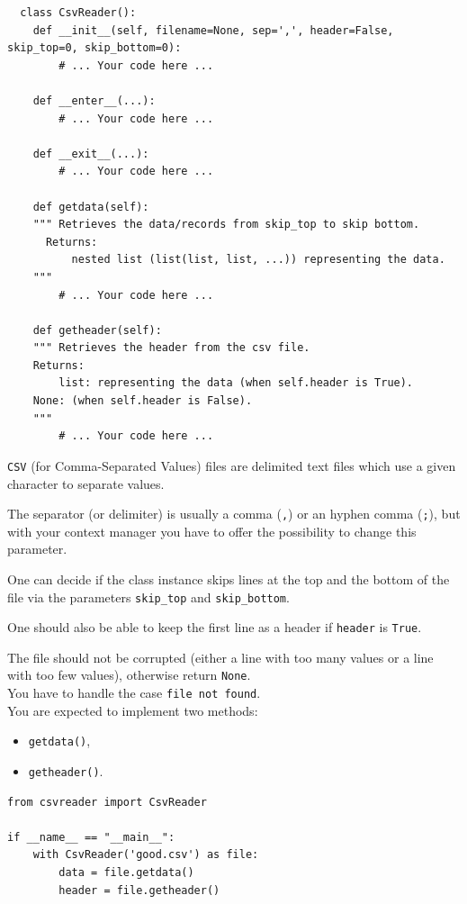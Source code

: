 \documentclass{42-en}
\begin{document}
\begin{verbatim}
  class CsvReader():
	def __init__(self, filename=None, sep=',', header=False, skip_top=0, skip_bottom=0):
		# ... Your code here ...

	def __enter__(...):
		# ... Your code here ...
	
	def __exit__(...):
		# ... Your code here ...
	
	def getdata(self):
	""" Retrieves the data/records from skip_top to skip bottom.
	  Returns:
		  nested list (list(list, list, ...)) representing the data.
	"""
		# ... Your code here ...

	def getheader(self):
	""" Retrieves the header from the csv file.
	Returns:
		list: representing the data (when self.header is True).
    None: (when self.header is False).
	"""
		# ... Your code here ...
\end{verbatim}

\texttt{CSV} (for Comma-Separated Values) files are delimited text files which use a given character to separate values.

The separator (or delimiter) is usually a comma (\texttt{,}) or an hyphen comma (\texttt{;}), 
but with your context manager you have to offer the possibility to change this parameter.

One can decide if the class instance skips lines at the top and the bottom of the file via the
parameters \texttt{skip\_top} and \texttt{skip\_bottom}.

One should also be able to keep the first line as a header if \texttt{header} is \texttt{True}.

The file should not be corrupted (either a line with too many values or a line
with too few values), otherwise return \texttt{None}.\\

You have to handle the case \texttt{file not found}.\\

You are expected to implement two methods:
\begin{itemize}
  \item \texttt{getdata()},
  \item \texttt{getheader()}.
\end{itemize}

\begin{verbatim}
from csvreader import CsvReader

if __name__ == "__main__":
	with CsvReader('good.csv') as file:
		data = file.getdata()
		header = file.getheader()
\end{verbatim}
\end{document}
